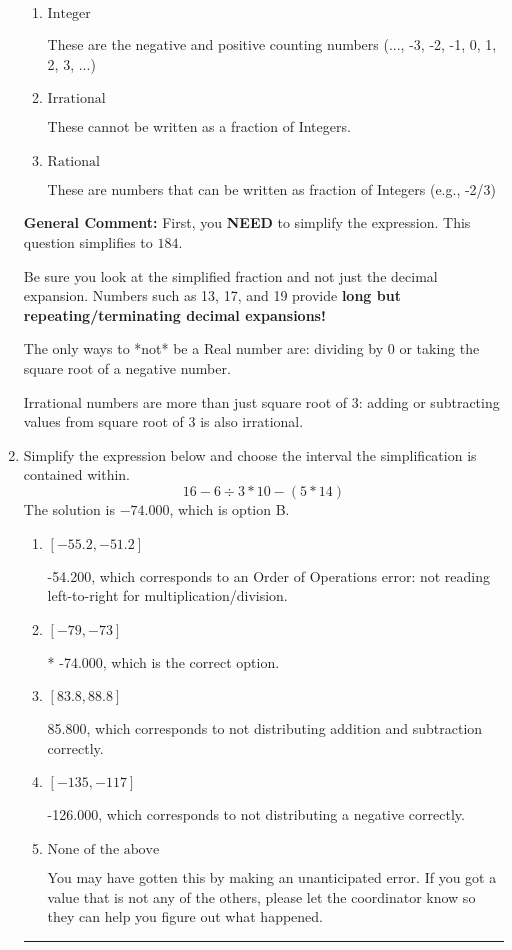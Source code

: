 \documentclass{extbook}[14pt]
\newcommand{\litem}[1]{\item #1

\rule{\textwidth}{0.4pt}}
\begin{document}
\begin{enumerate}
{\begin{enumerate}[label=\Alph*.]
These are Nonreal Complex numbers \textbf{OR} things that are not numbers (e.g., dividing by 0).
\item \( \text{Integer} \)

These are the negative and positive counting numbers (..., -3, -2, -1, 0, 1, 2, 3, ...)
\item \( \text{Irrational} \)

These cannot be written as a fraction of Integers.
\item \( \text{Rational} \)

These are numbers that can be written as fraction of Integers (e.g., -2/3)
\end{enumerate}

\textbf{General Comment:} First, you \textbf{NEED} to simplify the expression. This question simplifies to $184$. 
 
 Be sure you look at the simplified fraction and not just the decimal expansion. Numbers such as 13, 17, and 19 provide \textbf{long but repeating/terminating decimal expansions!} 
 
 The only ways to *not* be a Real number are: dividing by 0 or taking the square root of a negative number. 
 
 Irrational numbers are more than just square root of 3: adding or subtracting values from square root of 3 is also irrational.
}
\litem{
Simplify the expression below and choose the interval the simplification is contained within.
\[ 16 - 6 \div 3 * 10 - (5 * 14) \]The solution is \( -74.000 \), which is option B.\begin{enumerate}[label=\Alph*.]
\item \( [-55.2, -51.2] \)

 -54.200, which corresponds to an Order of Operations error: not reading left-to-right for multiplication/division.
\item \( [-79, -73] \)

* -74.000, which is the correct option.
\item \( [83.8, 88.8] \)

 85.800, which corresponds to not distributing addition and subtraction correctly.
\item \( [-135, -117] \)

 -126.000, which corresponds to not distributing a negative correctly.
\item \( \text{None of the above} \)

 You may have gotten this by making an unanticipated error. If you got a value that is not any of the others, please let the coordinator know so they can help you figure out what happened.
\end{enumerate}

}
\end{enumerate}
\end{document}

